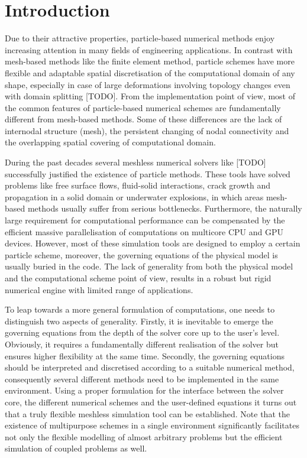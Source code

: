 \documentclass[a4paper,12pt,openany]{book}
\theoremstyle{break}
\begin{document}
\section{Introduction}
Due to their attractive properties, particle-based numerical methods enjoy increasing attention in many fields of engineering applications. In contrast with mesh-based methods  like the finite element method, particle schemes have more flexible and adaptable spatial discretisation of the computational domain of any shape, especially in case of large deformations involving topology changes even with domain splitting [TODO].
From the implementation point of view, most of the common features of particle-based numerical schemes are fundamentally different from mesh-based methods. Some of these differences are the lack of internodal structure (mesh), the persistent changing of nodal connectivity and the overlapping spatial covering of computational domain.

During the past decades several meshless numerical solvers like [TODO] successfully justified the existence of particle methods. These tools have solved problems like free surface flows, fluid-solid interactions, crack growth and propagation in a solid domain or underwater explosions, in which areas mesh-based methods usually suffer from serious bottlenecks. Furthermore, the naturally large requirement for computational performance can be compensated by the efficient massive parallelisation of computations on multicore CPU and GPU devices. However, most of these simulation tools are designed to employ a certain particle scheme, moreover, the governing equations of the physical model is usually buried in the code. The lack of generality from both the physical model and the computational scheme point of view, results in a robust but rigid numerical engine with limited range of applications. %

To leap towards a more general formulation of computations, one needs to distinguish two aspects of generality. Firstly, it is inevitable to emerge the governing equations from the depth of the solver core up to the user's level. Obviously, it requires a fundamentally different realisation of the solver but ensures higher flexibility at the same time. Secondly, the governing equations should be interpreted and discretised according to a suitable numerical method, consequently several different methods need to be implemented in the same environment. Using a proper formulation for the interface between the solver core, the different numerical schemes and the user-defined equations it turns out that a truly flexible meshless simulation tool can be established. Note that the existence of multipurpose schemes in a single environment significantly facilitates  not only the flexible modelling of almost arbitrary problems but the efficient simulation of coupled problems as well.
\end{document}
